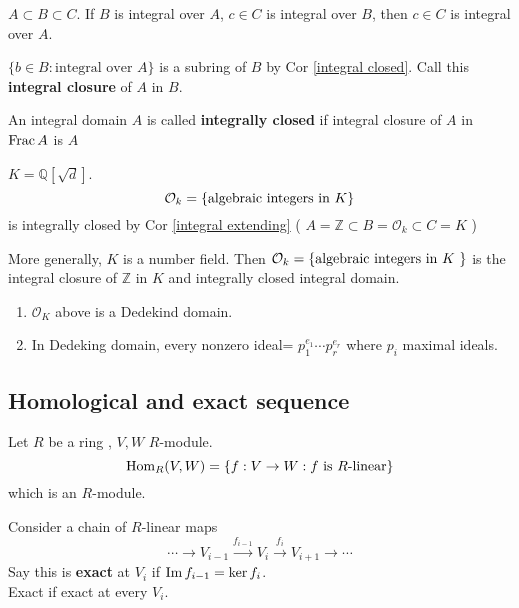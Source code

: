 \begin{corollary}\label{integral extending}
     $ A\subset B \subset C $. If  $ B  $ is integral over  $ A  $,  $ c\in C  $ is integral over  $ B  $, then  $ c\in C  $ is integral over  $ A $. 
\end{corollary}
\begin{definition}
     $ \{b\in B:\text{integral over }A\} $ is a subring of  $ B  $ by  Cor \ref{integral closed}.  Call this \textbf{integral closure} of  $ A  $ in  $ B  $.
\end{definition}
\begin{definition}
    An integral domain  $ A  $ is called \textbf{integrally closed } if integral closure of  $ A  $ in  $ \operatorname{Frac} A  $ is  $ A $ 
\end{definition}
\begin{example}
     $ K=\mathbb{Q}[\sqrt{d}] $.
     \[
        \mathcal{O}_k=\{\text{algebraic integers in  $ K  $}\}\\
    \]
    is integrally closed by Cor \ref{integral extending} ( $ A=\mathbb{Z}\subset B=\mathcal{O}_k\subset C=K $ )
\end{example}
More generally,  $ K  $ is a number field.
Then  $ \mathcal{O}_k=\{\text{algebraic integers in  $ K  $ }\} $ is the integral closure of  $ \mathbb{Z} $ in  $ K  $ and integrally closed integral domain.  
\begin{fact}
    \begin{enumerate}[(1)]
        \item  $ \mathcal{O}_K $ above is a Dedekind domain.
        \item In Dedeking domain, every nonzero ideal= $ p_1^{e_1}\cdots p_r^{e_r} $ where  $ p_i $ maximal ideals.  
    \end{enumerate}
\end{fact}
\subsection{Homological and exact sequence}
\begin{definition}
    Let  $ R  $ be a ring ,  $ V,W  $  $ R $-module.
    \[\operatorname{Hom}_R(V,W)=\{f:V\rightarrow W:f\text{ is $ R $-linear}\}\]
    which is an  $ R  $-module.
\end{definition}
\begin{definition}
    Consider a chain of  $ R $-linear maps
    \[\cdots\rightarrow V_{i-1}\xrightarrow{f_{i-1}}V_i\xrightarrow{f_i}V_{i+1}\rightarrow\cdots\]
    Say this is \textbf{exact} at  $ V_i  $ if  $ \operatorname{Im} f_{i-1}=\ker f_i $.\\
    Exact if exact at every  $ V_i $.  
\end{definition}

